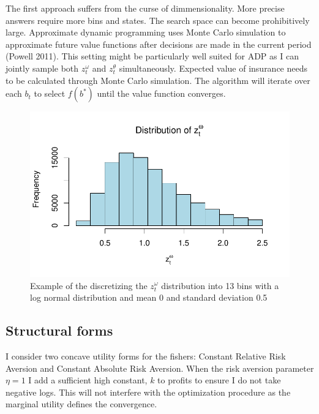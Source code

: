 \documentclass[
  letterpaper,
  DIV=11,
  numbers=noendperiod]{scrartcl}
\begin{document}
The first approach suffers from the curse of dimmensionality. More
precise answers require more bins and states. The search space can
become prohibitively large. Approximate dynamic programming uses Monte
Carlo simulation to approximate future value functions after decisions
are made in the current period (Powell 2011). This setting might be
particularly well suited for ADP as I can jointly sample both
\(z_t^\omega\) and \(z_t^\theta\) simultaneously. Expected value of
insurance needs to be calculated through Monte Carlo simulation. The
algorithm will iterate over each \(b_t\) to select \(f(b^*)\) until the
value function converges.

\begin{figure}

{\centering \includegraphics{docs_files/figure-pdf/fig-omega-1.pdf}

}

\caption{\label{fig-omega}Example of the discretizing the \(z_t^\omega\)
distribution into 13 bins with a log normal distribution and mean 0 and
standard deviation 0.5}

\end{figure}

\hypertarget{structural-forms}{%
\subsection{Structural forms}\label{structural-forms}}

I consider two concave utility forms for the fishers: Constant Relative
Risk Aversion and Constant Absolute Risk Aversion. When the risk
aversion parameter \(\eta=1\) I add a sufficient high constant, \(k\) to
profits to ensure I do not take negative logs. This will not interfere
with the optimization procedure as the marginal utility defines the
convergence.
\end{document}
